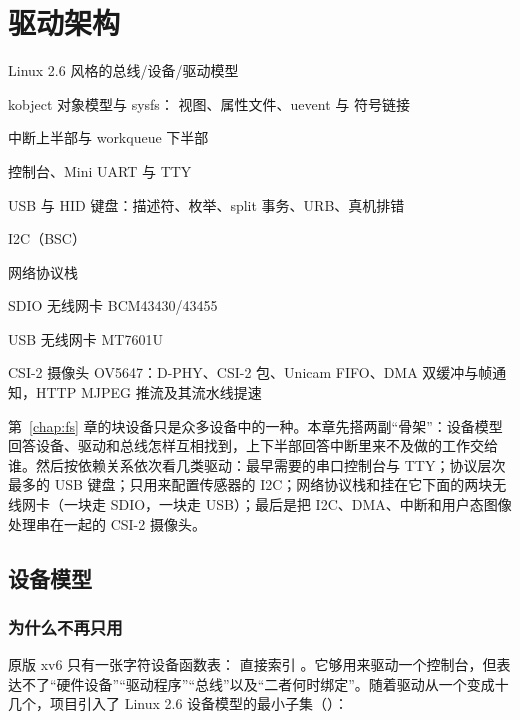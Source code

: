 \chapter{驱动架构}
\label{chap:drivers}

\begin{introduction}[本章内容]
  \item Linux 2.6 风格的总线/设备/驱动模型
  \item kobject 对象模型与 sysfs： 视图、属性文件、uevent 与  符号链接
  \item 中断上半部与 workqueue 下半部
  \item 控制台、Mini UART 与 TTY
  \item USB 与 HID 键盘：描述符、枚举、split 事务、URB、真机排错
  \item I2C（BSC）
  \item 网络协议栈
  \item SDIO 无线网卡 BCM43430/43455
  \item USB 无线网卡 MT7601U
  \item CSI-2 摄像头 OV5647：D-PHY、CSI-2 包、Unicam FIFO、DMA 双缓冲与帧通知，HTTP MJPEG 推流及其流水线提速
\end{introduction}

第~\ref{chap:fs} 章的块设备只是众多设备中的一种。本章先搭两副“骨架”：设备模型回答设备、驱动和总线怎样互相找到，上下半部回答中断里来不及做的工作交给谁。然后按依赖关系依次看几类驱动：最早需要的串口控制台与 TTY；协议层次最多的 USB 键盘；只用来配置传感器的 I2C；网络协议栈和挂在它下面的两块无线网卡（一块走 SDIO，一块走 USB）；最后是把 I2C、DMA、中断和用户态图像处理串在一起的 CSI-2 摄像头。

\section{设备模型}
\label{sec:devmodel}

\subsection{为什么不再只用 }

原版 xv6 只有一张字符设备函数表： 直接索引 。它够用来驱动一个控制台，但表达不了“硬件设备”“驱动程序”“总线”以及“二者何时绑定”。随着驱动从一个变成十几个，项目引入了 Linux 2.6 设备模型的最小子集（）：

